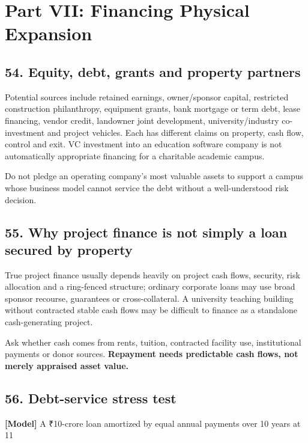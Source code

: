 \section*{Part VII: Financing Physical Expansion}


\subsection{54. Equity, debt, grants and property partners}

Potential sources include retained earnings, owner/sponsor capital, restricted construction philanthropy, equipment grants, bank mortgage or term debt, lease financing, vendor credit, landowner joint development, university/industry co-investment and project vehicles. Each has different claims on property, cash flow, control and exit. VC investment into an education software company is not automatically appropriate financing for a charitable academic campus.

Do not pledge an operating company's most valuable assets to support a campus whose business model cannot service the debt without a well-understood risk decision.


\subsection{55. Why project finance is not simply a loan secured by property}

True project finance usually depends heavily on project cash flows, security, risk allocation and a ring-fenced structure; ordinary corporate loans may use broad sponsor recourse, guarantees or cross-collateral. A university teaching building without contracted stable cash flows may be difficult to finance as a standalone cash-generating project.

Ask whether cash comes from rents, tuition, contracted facility use, institutional payments or donor sources. \textbf{Repayment needs predictable cash flows, not merely appraised asset value.}


\subsection{56. Debt-service stress test}

\textbf{[Model]} A \textnormal{₹}10-crore loan amortized by equal annual payments over 10 years at 11%


